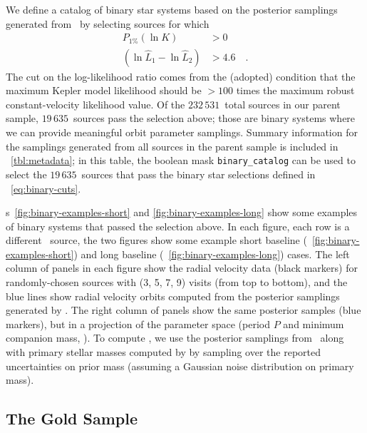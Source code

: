 \documentclass[modern]{aastex63}
\newcommand{\nsources}{\ensuremath{232\,531}}
\newcommand{\nbinary}{\ensuremath{19\,635}}
\begin{document}
We define a catalog of binary star systems based on the posterior samplings
generated from \thejoker\ by selecting sources for which
\begin{align}
    P_{1\%}(\ln K) &> 0\\
    (\ln \hat{L}_1 - \ln \hat{L}_2) &> 4.6 \quad . \label{eq:binary-cuts}
\end{align}
The cut on the log-likelihood ratio comes from the (adopted) condition that
the maximum Kepler model likelihood should be $>100$ times the maximum robust
constant-velocity likelihood value.
Of the \nsources\ total sources in our parent sample, \nbinary\ sources pass the
selection above; those are binary systems where we can provide meaningful orbit
parameter samplings.
Summary information for the samplings generated from all sources in the parent
sample is included in \tablename~\ref{tbl:metadata}; in this table, the boolean
mask \texttt{binary\_catalog} can be used to select the \nbinary\ sources that
pass the binary star selections defined in \equationname~\ref{eq:binary-cuts}.

\figurename s~\ref{fig:binary-examples-short} and \ref{fig:binary-examples-long}
show some examples of binary systems that passed the selection above.
In each figure, each row is a different \apogee\ source, the two figures show
some example short baseline (\figurename~\ref{fig:binary-examples-short}) and
long baseline (\figurename~\ref{fig:binary-examples-long}) cases.
The left column of panels in each figure show the radial velocity data (black
markers) for randomly-chosen sources with (3, 5, 7, 9) visits (from top to
bottom), and the blue lines show radial velocity orbits computed from the
posterior samplings generated by \thejoker.
The right column of panels show the same posterior samples (blue markers), but
in a projection of the parameter space (period $P$ and minimum companion mass,
\mtwomin).
To compute \mtwomin, we use the posterior samplings from \thejoker\ along with
primary stellar masses computed by \citet{Queiroz:2019} by sampling over the
reported uncertainties on prior mass (assuming a Gaussian noise distribution on
primary mass).

\subsection{The Gold Sample}
\label{sec:gold-sample}
\end{document}
